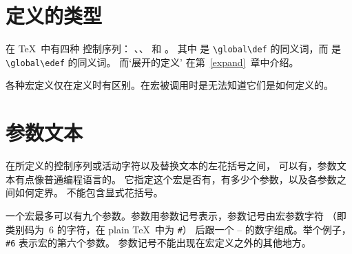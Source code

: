 \documentclass{book}
\begin{document}
\section{定义的类型}

在 \TeX\ 中有四种  控制序列：
、、 和 。
其中
 是 \verb>\global\def> 的同义词，而
 是 \verb>\global\edef> 的同义词。
而`展开的定义'  在第~\ref{expand}~章中介绍。

各种宏定义仅在定义时有区别。在宏被调用时是无法知道它们是如何定义的。

\section{参数文本}
\label{param:text}

在所定义的控制序列或活动字符以及替换文本的左花括号之间，
可以有，参数文本有点像普通编程语言的。
它指定这个宏是否有，有多少个参数，以及各参数之间如何定界。
 不能包含显式花括号。

一个宏最多可以有九个参数。参数用参数记号表示，参数记号由宏参数字符%
（即类别码为~6 的字符，在 plain \TeX\ 中为 \verb=#=）%
后跟一个 -- 的数字组成。举个例子，\verb>#6> 表示宏的第六个参数。
参数记号不能出现在宏定义之外的其他地方。
\end{document}
